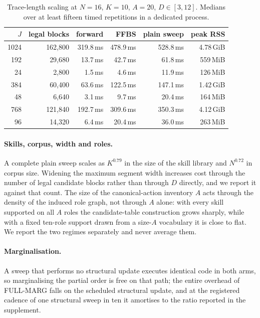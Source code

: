 \begin{table}[t]
  \centering
  \small
  \begin{tabular}{rrrrrr}
    \toprule
    $J$ & legal blocks & forward & FFBS & plain sweep & peak RSS \\
    \midrule
    1024 & 162,800 & 319.8\,ms & 478.9\,ms & 528.8\,ms & 4.78\,GiB \\
    192 & 29,680 & 13.7\,ms & 42.7\,ms & 61.8\,ms & 559\,MiB \\
    24 & 2,800 & 1.5\,ms & 4.6\,ms & 11.9\,ms & 126\,MiB \\
    384 & 60,400 & 63.6\,ms & 122.5\,ms & 147.1\,ms & 1.42\,GiB \\
    48 & 6,640 & 3.1\,ms & 9.7\,ms & 20.4\,ms & 164\,MiB \\
    768 & 121,840 & 192.7\,ms & 309.6\,ms & 350.3\,ms & 4.12\,GiB \\
    96 & 14,320 & 6.4\,ms & 20.4\,ms & 36.0\,ms & 263\,MiB \\
    \bottomrule
  \end{tabular}
  \caption{Trace-length scaling at $N=16$, $K=10$, $A=20$, $D\in[3,12]$. Medians
  over at least fifteen timed repetitions in a dedicated process.}
  \label{tab:scal-J}
\end{table}

\paragraph{Skills, corpus, width and roles.}
A complete plain sweep scales as $K^{0.79}$ in the size of the skill
library and $N^{0.72}$ in corpus size. Widening the maximum segment width
increases cost through the number of legal candidate blocks rather than through $D$
directly, and we report it against that count. The size of the canonical-action
inventory $A$ acts through the density of the induced role graph, not through $A$
alone: with every skill supported on all $A$ roles the candidate-table construction
grows sharply, while with a fixed ten-role support drawn from a size-$A$ vocabulary
it is close to flat. We report the two regimes separately and never average them.

\paragraph{Marginalisation.}
A sweep that performs no structural update executes identical code in both arms, so
marginalising the partial order is free on that path; the entire overhead of
FULL-MARG falls on the scheduled structural update, and at the registered cadence of
one structural sweep in ten it amortises to the ratio reported in the supplement.

